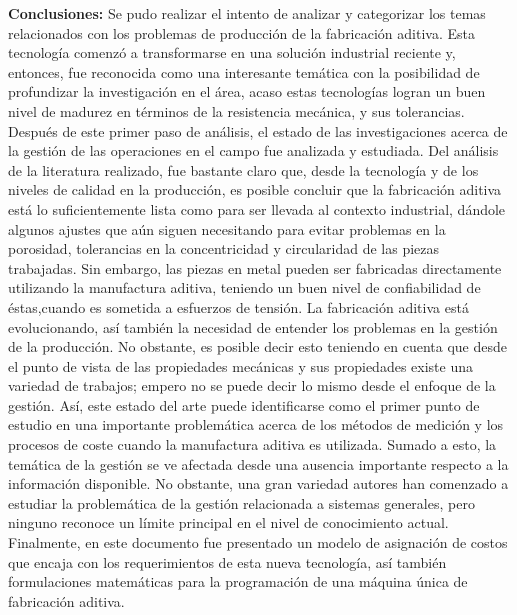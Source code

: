 \begin{description}
\item \textbf{Conclusiones:} Se pudo realizar el intento de analizar y categorizar los temas relacionados con los problemas de producción de la fabricación aditiva. Esta tecnología comenzó a transformarse en una solución industrial reciente y, entonces, fue reconocida como una interesante temática con la posibilidad de profundizar la investigación en el área, acaso estas tecnologías logran un buen nivel de madurez en términos de la resistencia mecánica, y sus tolerancias. Después de este primer paso de análisis, el estado de las investigaciones acerca de la gestión de las operaciones en el campo fue analizada y estudiada. 
Del análisis de la literatura realizado, fue bastante claro que, desde la tecnología y de los niveles de calidad en la producción, es posible concluir que la fabricación aditiva está lo suficientemente lista como para ser llevada al contexto industrial, dándole algunos ajustes que aún siguen necesitando para evitar problemas en la porosidad, tolerancias en la concentricidad y circularidad de las piezas trabajadas. Sin embargo, las piezas en metal pueden ser fabricadas directamente utilizando la manufactura aditiva, teniendo un buen nivel de confiabilidad de éstas,cuando es sometida a esfuerzos de tensión. La fabricación aditiva está evolucionando, así también la necesidad de entender los problemas en la gestión de la producción. No obstante, es posible decir esto teniendo en cuenta que desde el punto de vista de las propiedades mecánicas y sus propiedades existe una variedad de trabajos; empero no se puede decir lo mismo desde el enfoque de la gestión. Así, este estado del arte puede identificarse como el primer punto de estudio en una importante problemática acerca de los métodos de medición y los procesos de coste cuando la manufactura aditiva es utilizada. Sumado a esto, la temática de la gestión se ve afectada desde una ausencia importante respecto a la información disponible.  No obstante, una gran variedad autores han comenzado a estudiar la problemática de la gestión relacionada a sistemas generales, pero ninguno reconoce un límite principal en el nivel de conocimiento actual. Finalmente, en este documento fue presentado un modelo de asignación de costos que encaja con los requerimientos de esta nueva tecnología, así también formulaciones matemáticas para la programación de una máquina única de fabricación aditiva.   

\end{description}

